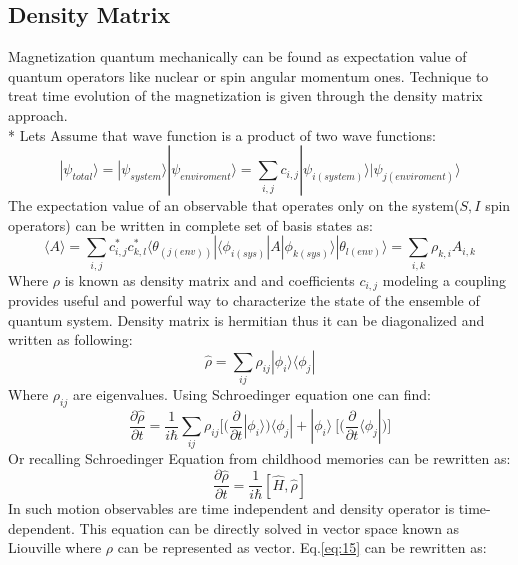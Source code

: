 \subsection{Density Matrix}\label{densitymatrixsubsection} 
Magnetization quantum mechanically can be found as expectation value of quantum operators like nuclear or spin angular momentum ones. Technique to treat time evolution of the magnetization is given through the density matrix approach.\\* 
Lets Assume that wave function is a product of two wave functions: 
\begin{equation}\label{eq:10}
|\psi_{total}\rangle=|\psi_{system}\rangle|\psi_{enviroment}\rangle=\sum_{i,j} c_{i,j}|\psi_{i(system)}\rangle|\psi_{j(enviroment)}\rangle
\end{equation}
The expectation value of an observable that operates only on the system($S,I$ spin operators) can be written in complete set of basis states as:
\begin{equation}\label{eq:11}
\langle A \rangle=\sum_{i,j} c_{i,j}^*c_{k,l}^*\langle \theta_{(j(env))}|\langle \phi _{i(sys)}|A|\phi_{k(sys)}\rangle|\theta_{l(env)}\rangle=\sum_{i,k}\rho_{k,i}A_{i,k}
\end{equation}
Where $\rho$ is known as density matrix and and coefficients $c_{i,j}$ modeling a coupling  provides useful and powerful way to characterize the state of the ensemble of quantum system. 
Density matrix is hermitian thus it can be diagonalized and written as following: 
\begin{equation}\label{eq:13}
\hat{\rho}=\sum_{ij}\rho_{ij}|\phi_i\rangle\langle \phi_j|
\end{equation} 
Where $\rho_{ij}$ are eigenvalues. 
Using Schroedinger equation one can find: 
\begin{equation}\label{eq:14}
\frac{\partial \hat{\rho}}{\partial t}=\frac{1}{i\hbar}\sum_{ij}\rho_{ij}\Big[\Big(\frac{\partial}{\partial t}|\phi_i\rangle\Big)\langle \phi_j|+|\phi_i\rangle\ \Big[\Big(\frac{\partial}{\partial t}\langle \phi_j|\Big)\Big]
\end{equation} 
Or recalling Schroedinger Equation from childhood memories can be rewritten as: 
 \begin{equation}\label{eq:15}
\frac{\partial \hat{\rho}}{\partial t}=\frac{1}{i\hbar}[\hat{H},\hat{\rho}]
\end{equation} 
In such motion observables are time independent and density operator is time-dependent. 
This equation can be directly solved in vector space known as Liouville where $\rho$ can be represented as vector. Eq.\ref{eq:15} can be rewritten as:

